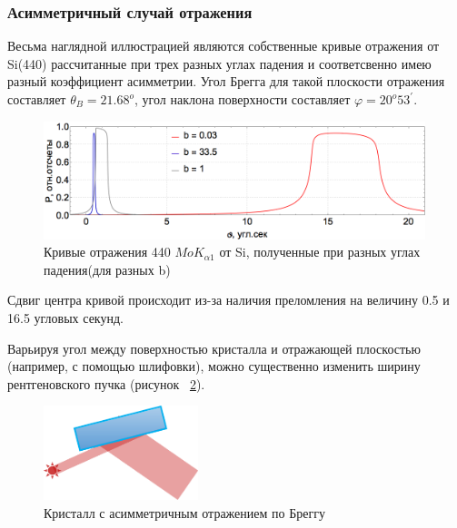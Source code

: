   \subsubsection{Асимметричный случай отражения}
  Весьма наглядной иллюстрацией являются собственные кривые отражения от Si(440) рассчитанные при
  трех разных углах падения и соответсвенно имею разный коэффициент асимметрии. Угол
  Брегга для такой плоскости отражения составляет $\theta_B = 21.68^o$, угол наклона поверхности
  составляет $\varphi = 20^o 53^{'}$.

  \begin{figure}[H]
  \centering
  \includegraphics[width=0.99\textwidth]{images/rocking_curve_assym_3.png}
  \caption{Кривые отражения 440 $MoK_{\alpha 1}$ от Si, полученные при разных углах падения(для разных b)}
  \label{ris:rocking_curve_assym_3}
  \end{figure}
  Сдвиг центра кривой происходит из-за наличия преломления на величину 0.5 и 16.5 угловых секунд.

  Варьируя угол между поверхностью кристалла и отражающей плоскостью (например, с помощью шлифовки),
  можно существенно изменить ширину рентгеновского пучка (рисунок ~\ref{ris:assym_width_beam}).
  \begin{figure}[H]
   \centering
   \includegraphics[width=0.4\textwidth]{images/assym_width_beam.png}
   \caption{Кристалл с асимметричным отражением по Бреггу}
   \label{ris:assym_width_beam}
  \end{figure}


